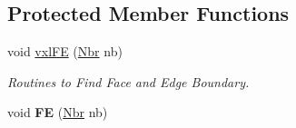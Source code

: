 \subsection*{Protected Member Functions}
\begin{DoxyCompactItemize}
\item 
\hypertarget{classvsr_1_1_lattice_abe07e1c384339da961e0b0c5e776c84a}{void \hyperlink{classvsr_1_1_lattice_abe07e1c384339da961e0b0c5e776c84a}{vxl\-F\-E} (\hyperlink{classvsr_1_1_nbr}{Nbr} nb)}\label{classvsr_1_1_lattice_abe07e1c384339da961e0b0c5e776c84a}

\begin{DoxyCompactList}\small\item\em Routines to Find Face and Edge Boundary. \end{DoxyCompactList}\item 
\hypertarget{classvsr_1_1_lattice_a6193b5a3ba1aceb7b074bb8515f8eb61}{void {\bfseries F\-E} (\hyperlink{classvsr_1_1_nbr}{Nbr} nb)}\label{classvsr_1_1_lattice_a6193b5a3ba1aceb7b074bb8515f8eb61}

\end{DoxyCompactItemize}
